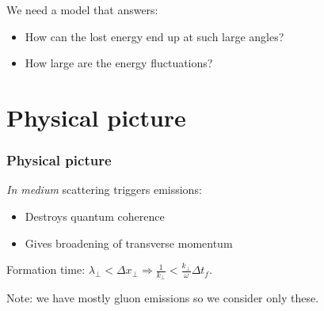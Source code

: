 \documentclass[pstricks,mathserif]{beamer}
\begin{document}
\begin{frame}
We need a model that answers:
\begin{itemize}
\item How can the lost energy end up at such large angles?
\item How large are the energy fluctuations?
\end{itemize}
\end{frame}

\section{Physical picture}

\begin{frame}
\frametitle{Physical picture}

{\em In medium} scattering triggers emissions:
\begin{itemize}
\item Destroys quantum coherence
\item Gives broadening of transverse momentum
\end{itemize}


Formation time: $\lambda_\perp<\Delta x_\perp \Rightarrow \frac{1}{k_\perp}<\frac{k_\perp}{\omega}\Delta t_f .$



\begin{center}


\end{center}

Note: we have mostly gluon emissions so we consider only these.

\end{frame}
\end{document}
